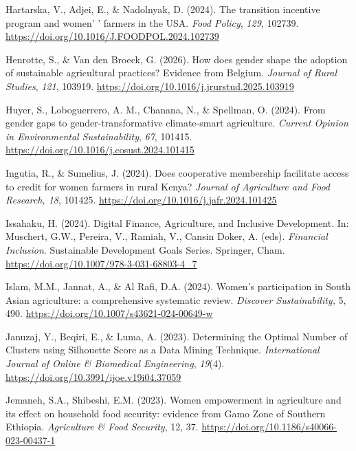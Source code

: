 ﻿\documentclass[sn-mathphys-num]{sn-jnl}
\newcommand{\hl}[1]{#1}
\begin{document}
\hl{Hartarska, V., Adjei, E., \& Nadolnyak, D. (2024). The transition
incentive program and women' ' farmers in the USA. \emph{Food Policy},
\emph{129}, 102739.}
\href{https://doi.org/10.1016/J.FOODPOL.2024.102739}{\hl{https://doi.org/10.1016/J.FOODPOL.2024.102739}}

\hl{Henrotte, S., \& Van den Broeck, G. (2026). How does gender shape
the adoption of sustainable agricultural practices? Evidence from
Belgium. \emph{Journal of Rural Studies}, \emph{121}, 103919.}
\href{https://doi.org/10.1016/j.jrurstud.2025.103919}{\hl{https://doi.org/10.1016/j.jrurstud.2025.103919}}

\hl{Huyer, S., Loboguerrero, A. M., Chanana, N., \& Spellman, O. (2024).
From gender gaps to gender-transformative climate-smart agriculture.
\emph{Current Opinion in Environmental Sustainability}, \emph{67},
101415.}
\href{https://doi.org/10.1016/j.cosust.2024.101415}{\hl{https://doi.org/10.1016/j.cosust.2024.101415}}

\hl{Ingutia, R., \& Sumelius, J. (2024). Does cooperative membership
facilitate access to credit for women farmers in rural Kenya?
\emph{Journal of Agriculture and Food Research, 18}, 101425.}
\href{https://doi.org/10.1016/j.jafr.2024.101425}{\hl{https://doi.org/10.1016/j.jafr.2024.101425}}

\hl{Issahaku, H. (2024). Digital Finance, Agriculture, and Inclusive
Development. In: Muschert, G.W., Pereira, V., Ramiah, V., Cansin Doker,
A. (eds). \emph{Financial Inclusion}. Sustainable Development Goals
Series. Springer, Cham.}
\href{https://doi.org/10.1007/978-3-031-68803-4_7}{\hl{https://doi.org/10.1007/978-3-031-68803-4\_7}}

\hl{Islam, M.M., Jannat, A., \& Al Rafi, D.A. (2024). Women's
participation in South Asian agriculture: a comprehensive systematic
review. \emph{Discover Sustainability,} 5, 490.}
\href{https://doi.org/10.1007/s43621-024-00649-w}{\hl{https://doi.org/10.1007/s43621-024-00649-w}}

\hl{Januzaj, Y., Beqiri, E., \& Luma, A. (2023). Determining the Optimal
Number of Clusters using Silhouette Score as a Data Mining Technique.
\emph{International Journal of Online \& Biomedical Engineering},
\emph{19}(4).}
\href{https://doi.org/10.3991/ijoe.v19i04.37059}{\hl{https://doi.org/10.3991/ijoe.v19i04.37059}}

\hl{Jemaneh, S.A., Shibeshi, E.M. (2023). Women empowerment in
agriculture and its effect on household food security: evidence from
Gamo Zone of Southern Ethiopia. \emph{Agriculture \& Food Security}, 12,
37.}
\href{https://doi.org/10.1186/s40066-023-00437-1}{\hl{https://doi.org/10.1186/s40066-023-00437-1}}
\end{document}
